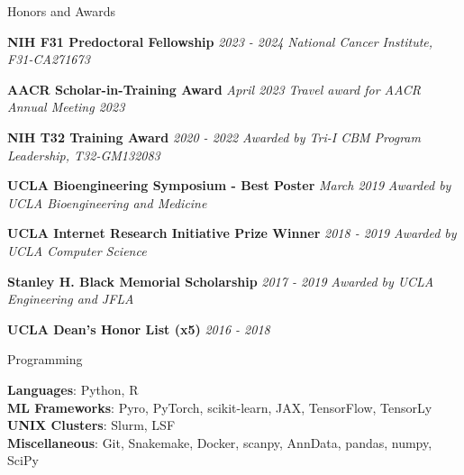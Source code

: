 \documentclass{resume} %
\begin{document}
\begin{rSection}{Honors and Awards}


\item \textbf{NIH F31 Predoctoral Fellowship} \hfill {\em 2023 - 2024}
\newline
\textit{National Cancer Institute, F31-CA271673}

\item \textbf{AACR Scholar-in-Training Award} \hfill {\em April 2023}
\newline
\textit{Travel award for AACR Annual Meeting 2023}

\item \textbf{NIH T32 Training Award} \hfill {\em2020 - 2022}
\newline
\textit{Awarded by Tri-I CBM Program Leadership, T32-GM132083}

\item \textbf{UCLA Bioengineering Symposium - Best Poster} \hfill {\em March 2019}
\newline
\textit{Awarded by UCLA Bioengineering and Medicine}

\item \textbf{UCLA Internet Research Initiative Prize Winner} \hfill {\em 2018 - 2019}
\newline
\textit{Awarded by UCLA Computer Science}

\item \textbf{Stanley H. Black Memorial Scholarship} \hfill {\em 2017 - 2019}
\newline
\textit{Awarded by UCLA Engineering and JFLA}

\item \textbf{UCLA Dean’s Honor List (x5)} \hfill {\em 2016 - 2018}

\end{rSection}



\begin{rSection}{Programming}

\textbf{Languages}: Python, R \\
\textbf{ML Frameworks}: Pyro, PyTorch, scikit-learn, JAX, TensorFlow, TensorLy \\
\textbf{UNIX Clusters}: Slurm, LSF \\
\textbf{Miscellaneous}: Git, Snakemake, Docker, scanpy, AnnData, pandas, numpy, SciPy

\end{rSection}
\end{document}
